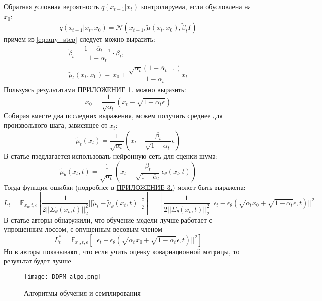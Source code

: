 Обратная условная вероятность $q(x_{t-1}\vert x_t)$ контролируема, если обусловлена на $x_0$:
\begin{equation}
    q(x_{t-1}\vert x_t, x_0) = \mathcal{N}(x_{t-1}, \tilde{\mu}(x_t, x_0), \tilde{\beta}_t  I)  
    \label{eq:controlable_condition}
\end{equation}
причем из \ref{eq:any_step} следует можно выразить:
\[
    \begin{array}{c}
        \tilde{\beta}_t = \dfrac{1 - \overline{\alpha}_{t-1}}{1 - \overline{\alpha}_t} \cdot \beta_t,  \\[0.5cm]
        \tilde{\mu}_t(x_t, x_0) = \dfrac{}{} x_0 + \dfrac{\sqrt{\alpha_t}(1 - \overline{\alpha}_{t-1})}{1-\overline{\alpha}_t} x_t
    \end{array}
\]
Пользуясь результатами \hyperref[AppendixA]{ПРИЛОЖЕНИЕ 1.} можно выразить:
\[
    x_0 = \dfrac{1}{\sqrt{\overline{\alpha}_t}} (x_t - \sqrt{1 - \overline{\alpha}_t \epsilon})  
\]
Собирая вместе два последних выражения, можем получить среднее для произвольного шага, зависящее от $x_t$:
\[
    \tilde{\mu}_t(x_t) = \dfrac{1}{\sqrt{\alpha_t}} \left(x_t - \dfrac{\beta_t}{\sqrt{1 - \overline{\alpha}_t}}\epsilon\right)
\]
В статье \cite{ho2020denoising} предлагается использовать нейронную сеть для оценки шума:
\[
    \tilde{\mu}_\theta(x_t, t) = \dfrac{1}{\sqrt{\alpha_t}}\left(x_t - \dfrac{\beta_t}{\sqrt{1 - \overline{\alpha}_t}}\epsilon_\theta(x_t, t)\right)  
\]
Тогда функция ошибки (подробнее в \hyperref[AppendixC]{ПРИЛОЖЕНИЕ 3.}) может быть выражена:
\[
    L_t = \mathbb{E}_{x_0, t, \epsilon}\left[\dfrac{1}{2||\Sigma_\theta(x_t, t)||_2^2} ||\tilde{\mu}_t - \tilde{\mu}_\theta(x_t, t)||_2^2\right] = \mathbb{}_{} \left[\dfrac{1}{2||\Sigma_\theta(x_t, t)||_2^2} ||\epsilon_t - \epsilon_\theta(\sqrt{\overline{\alpha}_t}x_0 + \sqrt{1 - \overline{\alpha}_t}\epsilon, t)||^2\right]
\]
В статье \cite{ho2020denoising} авторы обнаружили, что обучение модели лучше работает с упрощенным лоссом, с опущенным весовым членом
\[
    L_t^* = \mathbb{E}_{x_0, t, \epsilon}\left[||\epsilon_t - \epsilon_\theta(\sqrt{\overline{\alpha}_t}x_0 + \sqrt{1 - \overline{\alpha}_t}\epsilon, t)||^2\right]  
\]
Но в \cite{nichol2021improved} авторы показывают, что если учить оценку ковариационной матрицы, то результат будет лучше.
\begin{figure}[H]
    \centering
    \texttt{[image: DDPM-algo.png]}
    \caption{Алгоритмы обучения и семплирования \cite{ho2020denoising}}
    \label{fig:algo_ddpm}
\end{figure}

